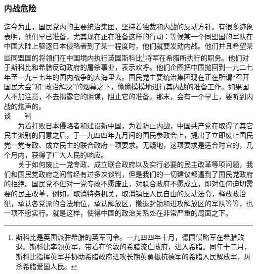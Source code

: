 \documentclass[cn,11pt,chinese]{elegantbook}
\def\myformat#1{\hfil\hfil #1}
\begin{document}
\subsubsection*{\myformat{内战危险}}
迄今为止，国民党内的主要统治集团，坚持着独裁和内战的反动方针。有很多迹象表明，他们早已准备，尤其现在正在准备这样的行动：等候某一个同盟国的军队在中国大陆上驱逐日本侵略者到了某一程度时，他们就要发动内战。他们并且希望某些同盟国的将领们在中国境内执行英国斯科比\footnote[12]{ 斯科比是英国派驻希腊的英军司令。一九四四年十月，德国侵略军在希腊败退。斯科比率领英军，带着在伦敦的希腊流亡政府，进入希腊。同年十二月，斯科比指挥英军并协助希腊政府进攻长期英勇抵抗德军的希腊人民解放军，屠杀希腊爱国人民。}将军在希腊所执行的职务。他们对于斯科比和希腊反动政府的屠杀事业，表示欢呼。他们企图把中国抛回到一九二七年至一九三七年的国内战争的大海里去。国民党主要统治集团现在正在所谓“召开国民大会”和“政治解决”的烟幕之下，偷偷摸摸地进行其内战的准备工作。如果国人不加注意，不去揭露它的阴谋，阻止它的准备，那末，会有一个早上，要听到内战的炮声的。\\
谈　　判\\
　　为着打败日本侵略者和建设新中国，为着防止内战，中国共产党在取得了其它民主派别的同意之后，于一九四四年九月间的国民参政会上，提出了立即废止国民党一党专政、成立民主的联合政府一项要求。无疑地，这项要求是适合时宜的，几个月内，获得了广大人民的响应。\\
　　关于如何废止一党专政、成立联合政府以及实行必要的民主改革等项问题，我们和国民党政府之间曾经有过多次谈判，但是我们的一切建议都遭到了国民党政府的拒绝。国民党不但对一党专政不愿废止，对联合政府不愿成立，即对任何迫切需要的民主改革，例如，取消特务机关，取消镇压人民自由的反动法令，释放政治犯，承认各党派的合法地位，承认解放区，撤退封锁和进攻解放区的军队等等，也一项不愿实行。就是这样，使得中国的政治关系处在非常严重的局面之下。\\
\end{document}
